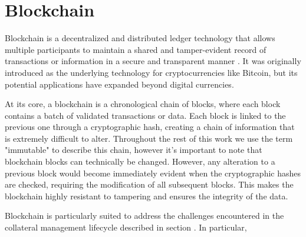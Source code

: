 \section{Blockchain}
\label{sec:blockchain}
Blockchain is a decentralized and distributed ledger technology that allows multiple participants to maintain a shared and tamper-evident record of transactions or information in a secure and transparent manner \citep{morini2016blockchain}. It was originally introduced as the underlying technology for cryptocurrencies like Bitcoin, but its potential applications have expanded beyond digital currencies.

At its core, a blockchain is a chronological chain of blocks, where each block contains a batch of validated transactions or data. Each block is linked to the previous one through a cryptographic hash, creating a chain of information that is extremely difficult to alter. Throughout the rest of this work we use the term "immutable" to describe this chain, however it's important to note that blockchain blocks can technically be changed. However, any alteration to a previous block would become immediately evident when the cryptographic hashes are checked, requiring the modification of all subsequent blocks. This makes the blockchain highly resistant to tampering and ensures the integrity of the data.

Blockchain is particularly suited to address the challenges encountered in the collateral management lifecycle described in section \label{sec: infratrcture_challenges}. In particular,

